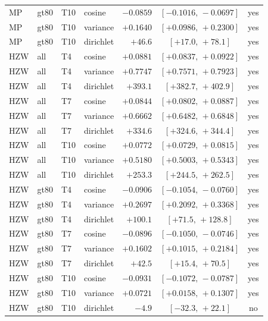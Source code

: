 \documentclass[a4paper,10pt]{article}
\begin{document}
\begin{table}[htbp]
\begin{tabular}{l l l l r c c}
MP & gt80 & T10 & cosine & \(-0.0859\) & \([-0.1016,\,-0.0697]\) & yes \\
MP & gt80 & T10 & variance & \(+0.1640\) & \([+0.0986,\,+0.2300]\) & yes \\
MP & gt80 & T10 & dirichlet & \(+46.6\) & \([+17.0,\,+78.1]\) & yes \\
HZW & all & T4 & cosine & \(+0.0881\) & \([+0.0837,\,+0.0922]\) & yes \\
HZW & all & T4 & variance & \(+0.7747\) & \([+0.7571,\,+0.7923]\) & yes \\
HZW & all & T4 & dirichlet & \(+393.1\) & \([+382.7,\,+402.9]\) & yes \\
HZW & all & T7 & cosine & \(+0.0844\) & \([+0.0802,\,+0.0887]\) & yes \\
HZW & all & T7 & variance & \(+0.6662\) & \([+0.6482,\,+0.6848]\) & yes \\
HZW & all & T7 & dirichlet & \(+334.6\) & \([+324.6,\,+344.4]\) & yes \\
HZW & all & T10 & cosine & \(+0.0772\) & \([+0.0729,\,+0.0815]\) & yes \\
HZW & all & T10 & variance & \(+0.5180\) & \([+0.5003,\,+0.5343]\) & yes \\
HZW & all & T10 & dirichlet & \(+253.3\) & \([+244.5,\,+262.5]\) & yes \\
HZW & gt80 & T4 & cosine & \(-0.0906\) & \([-0.1054,\,-0.0760]\) & yes \\
HZW & gt80 & T4 & variance & \(+0.2697\) & \([+0.2092,\,+0.3368]\) & yes \\
HZW & gt80 & T4 & dirichlet & \(+100.1\) & \([+71.5,\,+128.8]\) & yes \\
HZW & gt80 & T7 & cosine & \(-0.0896\) & \([-0.1050,\,-0.0746]\) & yes \\
HZW & gt80 & T7 & variance & \(+0.1602\) & \([+0.1015,\,+0.2184]\) & yes \\
HZW & gt80 & T7 & dirichlet & \(+42.5\) & \([+15.4,\,+70.5]\) & yes \\
HZW & gt80 & T10 & cosine & \(-0.0931\) & \([-0.1072,\,-0.0787]\) & yes \\
HZW & gt80 & T10 & variance & \(+0.0721\) & \([+0.0158,\,+0.1307]\) & yes \\
HZW & gt80 & T10 & dirichlet & \(-4.9\) & \([-32.3,\,+22.1]\) & no \\
\bottomrule
\end{tabular}
\end{table}
\end{document}
